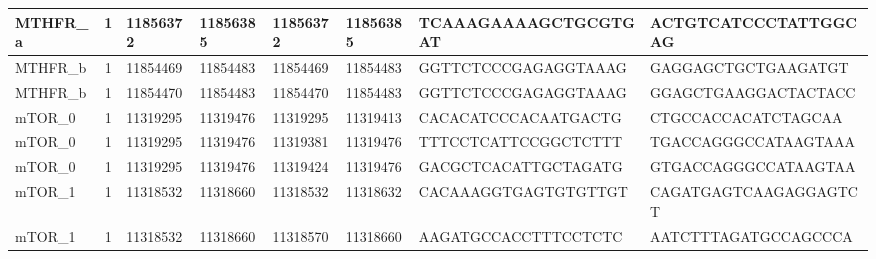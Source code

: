 \begin{landscape}
\begin{longtable}{| p{} | p{} | p{} | p{} | p{} | p{} | p{} | p{} |}
\multicolumn{1}{|l|}{MTHFR\_a}   & \multicolumn{1}{c|}{1}  & \multicolumn{1}{l|}{11856372}  & \multicolumn{1}{l|}{11856385}  & \multicolumn{1}{l|}{11856372}  & \multicolumn{1}{l|}{11856385}  & \multicolumn{1}{l|}{TCAAAGAAAAGCTGCGTGAT}            & \multicolumn{1}{l|}{ACTGTCATCCCTATTGGCAG}          \\ \hline
\multicolumn{1}{|l|}{MTHFR\_b}   & \multicolumn{1}{c|}{1}  & \multicolumn{1}{l|}{11854469}  & \multicolumn{1}{l|}{11854483}  & \multicolumn{1}{l|}{11854469}  & \multicolumn{1}{l|}{11854483}  & \multicolumn{1}{l|}{GGTTCTCCCGAGAGGTAAAG}            & \multicolumn{1}{l|}{GAGGAGCTGCTGAAGATGT}           \\ \hline
\multicolumn{1}{|l|}{MTHFR\_b}   & \multicolumn{1}{c|}{1}  & \multicolumn{1}{l|}{11854470}  & \multicolumn{1}{l|}{11854483}  & \multicolumn{1}{l|}{11854470}  & \multicolumn{1}{l|}{11854483}  & \multicolumn{1}{l|}{GGTTCTCCCGAGAGGTAAAG}            & \multicolumn{1}{l|}{GGAGCTGAAGGACTACTACC}          \\ \hline
\multicolumn{1}{|l|}{mTOR\_0}    & \multicolumn{1}{c|}{1}  & \multicolumn{1}{l|}{11319295}  & \multicolumn{1}{l|}{11319476}  & \multicolumn{1}{l|}{11319295}  & \multicolumn{1}{l|}{11319413}  & \multicolumn{1}{l|}{CACACATCCCACAATGACTG}            & \multicolumn{1}{l|}{CTGCCACCACATCTAGCAA}           \\ \hline
\multicolumn{1}{|l|}{mTOR\_0}    & \multicolumn{1}{c|}{1}  & \multicolumn{1}{l|}{11319295}  & \multicolumn{1}{l|}{11319476}  & \multicolumn{1}{l|}{11319381}  & \multicolumn{1}{l|}{11319476}  & \multicolumn{1}{l|}{TTTCCTCATTCCGGCTCTTT}            & \multicolumn{1}{l|}{TGACCAGGGCCATAAGTAAA}          \\ \hline
\multicolumn{1}{|l|}{mTOR\_0}    & \multicolumn{1}{c|}{1}  & \multicolumn{1}{l|}{11319295}  & \multicolumn{1}{l|}{11319476}  & \multicolumn{1}{l|}{11319424}  & \multicolumn{1}{l|}{11319476}  & \multicolumn{1}{l|}{GACGCTCACATTGCTAGATG}            & \multicolumn{1}{l|}{GTGACCAGGGCCATAAGTAA}          \\ \hline
\multicolumn{1}{|l|}{mTOR\_1}    & \multicolumn{1}{c|}{1}  & \multicolumn{1}{l|}{11318532}  & \multicolumn{1}{l|}{11318660}  & \multicolumn{1}{l|}{11318532}  & \multicolumn{1}{l|}{11318632}  & \multicolumn{1}{l|}{CACAAAGGTGAGTGTGTTGT}            & \multicolumn{1}{l|}{CAGATGAGTCAAGAGGAGTCT}         \\ \hline
\multicolumn{1}{|l|}{mTOR\_1}    & \multicolumn{1}{c|}{1}  & \multicolumn{1}{l|}{11318532}  & \multicolumn{1}{l|}{11318660}  & \multicolumn{1}{l|}{11318570}  & \multicolumn{1}{l|}{11318660}  & \multicolumn{1}{l|}{AAGATGCCACCTTTCCTCTC}            & \multicolumn{1}{l|}{AATCTTTAGATGCCAGCCCA}          \\ \hline

\end{longtable}
\end{landscape}
